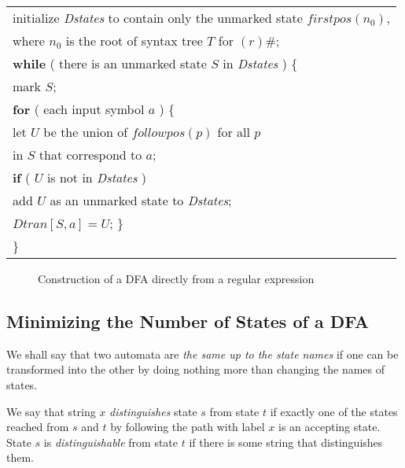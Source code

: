 \documentclass[12pt,a4paper,twoside,openany]{book}
\begin{document}
\begin{center}
    \begin{tabular}{l}
        initialize \textit{Dstates} to contain only the unmarked state $firstpos(n_0)$,\\
        \qquad where $n_0$ is the root of syntax tree $T$ for $(r)\#$;\\
        \textbf{while} ( there is an unmarked state $S$ in \textit{Dstates} ) \{\\
        \qquad mark $S$;\\
        \qquad\textbf{for} ( each input symbol $a$ ) \{\\
        \qquad\qquad let $U$ be the union of $followpos(p)$ for all $p$\\
        \qquad\qquad\qquad in $S$ that correspond to $a$;\\
        \qquad\qquad\textbf{if} ( $U$ is not in \textit{Dstates} )\\
        \qquad\qquad\qquad add $U$ as an unmarked state to \textit{Dstates};\\
        \qquad\qquad$Dtran[S,a]=U$;
        \qquad\}\\
        \}
    \end{tabular}
\end{center}
\begin{figure}[htbp]
    \caption{Construction of a DFA directly from a regular expression}
    \label{Figure:3.62}
\end{figure}

\subsection{Minimizing the Number of States of a DFA}

We shall say that two automata are \textit{the same up to the state names} if one can be transformed into the other by doing nothing more than changing the names of states.

We say that string $x$ \textit{distinguishes} state $s$ from state $t$ if exactly one of the states reached from $s$ and $t$ by following the path with label $x$ is an accepting state. State $s$ is \textit{distinguishable} from state $t$ if there is some string that distinguishes them.
\end{document}
